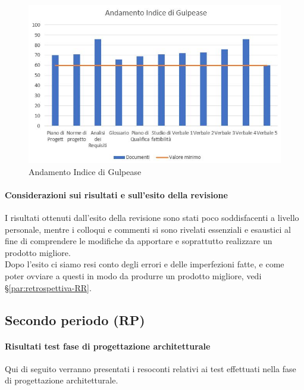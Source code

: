 \documentclass[../piano_di_qualifica.tex]{subfiles}
\begin{document}
\begin{figure}[H]
	\centering
	\includegraphics[width=12cm]{img/media_gul.jpg}
	\caption{ Andamento Indice di Gulpease}
\end{figure}

\paragraph{Considerazioni sui risultati e sull’esito della revisione }
I risultati ottenuti dall’esito della revisione sono stati poco soddisfacenti a livello personale, 
mentre i colloqui e commenti si sono rivelati essenziali e esaustici al fine di comprendere le modifiche da apportare
e soprattutto realizzare un prodotto migliore. \\
Dopo l'esito ci siamo resi conto degli errori e delle imperfezioni fatte, 
e come poter ovviare a questi in modo da produrre un prodotto migliore, vedi \S\ref{par:retrospettiva-RR}. \\


\subsection{Secondo periodo (RP)}
\label{sub:periodo-RP}
\paragraph{Risultati test fase di progettazione architetturale}
Qui di seguito verranno presentati i resoconti relativi ai test effettuati nella fase di progettazione architetturale. \par
\end{document}
